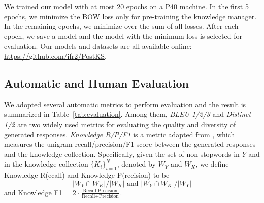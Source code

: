 \documentclass{article}
\begin{document}
We trained our model with at most 20 epochs on a P40 machine.
In the first 5 epochs,
we minimize the BOW loss only for pre-training the knowledge manager.
In the remaining epochs,
we minimize over the sum of all losses.
After each epoch, we save a model and 
the model with the minimum loss is selected for evaluation.
Our models and datasets are all available online: \url{https://github.com/ifr2/PostKS}.

\subsection{Automatic and Human Evaluation}
We adopted several automatic metrics to perform evaluation
and the result is summarized in Table~\ref{tab:evaluation}.
Among them,
\emph{BLEU-1/2/3} and \emph{Distinct-1/2} are two widely used metrics for evaluating the quality and diversity of generated responses.
\emph{Knowledge R/P/F1} is a metric adapted from \cite{dinan2018wizard},
which measures the unigram recall/precision/F1 score between the generated responses and the knowledge collection.
Specifically,
given the set of non-stopwords in $Y$ and in the knowledge collection $\{K_i\}_{i=1}^N$, denoted by 
$W_Y$ and $W_K$,
we define Knowledge R(ecall) and Knowledge P(recision) to be
$$|W_Y\cap W_K|/|W_K| \textrm{ and } |W_Y\cap W_K|/|W_Y|$$
and Knowledge F1 = $2 \cdot \frac{\textrm{Recall}\cdot \textrm{Precision}}{\textrm{Recall} + \textrm{Precision}}$.
\end{document}
